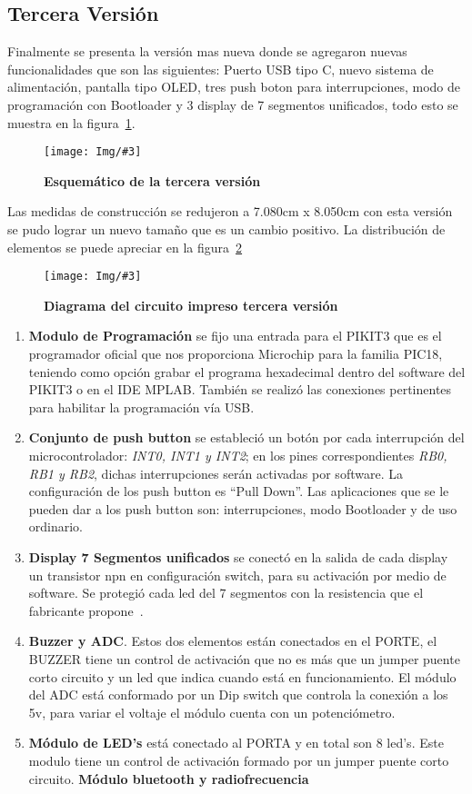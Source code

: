 \documentclass[times, 10pt,twocolumn]{article}
\newcommand{\Img}[5]{
   \begin{figure}[H]
   	   \centering
       \texttt{[image: Img/\#3]}
       \caption{ \centering \textbf{\small #4}}
       \label{#5}
       \end{figure}
   }
\begin{document}
\subsection{Tercera Versión}
Finalmente se presenta la versión mas nueva donde se agregaron nuevas funcionalidades que son las siguientes: Puerto USB tipo C, nuevo sistema de alimentación, pantalla tipo OLED, tres push boton para interrupciones, modo de programación con Bootloader y 3 display de 7 segmentos unificados, todo esto se muestra en la figura~\ref{fig:9}.
\Img{8.5cm}{7.0cm}{Tercera_Version}{Esquemático de la tercera versión}{fig:9}
Las medidas de construcción se redujeron a 7.080cm x 8.050cm con esta versión se pudo lograr un nuevo tamaño que es un cambio positivo. La distribución de elementos se puede apreciar en la figura~\ref{fig:10}
\Img{7.5cm}{7.0cm}{tercera_version_pcb}{Diagrama del circuito impreso tercera versión}{fig:10}
\begin{enumerate}[label=\emph{\Alph*.}] 
  \item \textbf{Modulo de Programación} se fijo una entrada para el PIKIT3 que es el programador oficial que nos proporciona Microchip para la familia PIC18, teniendo como opción grabar el programa hexadecimal dentro del software del PIKIT3 o en el IDE MPLAB. También se realizó las conexiones pertinentes para habilitar la programación vía USB.   
 
  \item \textbf{Conjunto de push button} se estableció un botón por cada interrupción del microcontrolador: \textit{INT0, INT1 y INT2}; en los pines correspondientes \textit{RB0, RB1 y  RB2}, dichas interrupciones serán activadas por software. La configuración de los push button es ``Pull Down''. Las aplicaciones que se le pueden dar a los push button son: interrupciones, modo Bootloader y de uso ordinario.

 
  \item \textbf{Display 7 Segmentos unificados} se conectó en la salida de cada display un transistor npn en configuración switch, para su activación por medio de software. Se protegió cada led del 7 segmentos con la resistencia que el fabricante propone~\cite{ex2}.
  \item \textbf{Buzzer y ADC}. Estos dos elementos están conectados en el PORTE, el BUZZER tiene un control de activación que no es más que un jumper puente corto circuito y un led que indica cuando está en funcionamiento. El módulo del ADC está conformado por un Dip switch que controla la conexión a los 5v, para variar el voltaje el módulo cuenta con un potenciómetro. 
  \item \textbf{Módulo de LED's} está conectado al PORTA y en total son 8 led's. Este modulo tiene un control de activación formado por un jumper puente corto circuito.
    \ite \textbf{Módulo bluetooth y radiofrecuencia}
\end{enumerate}
\end{document}
